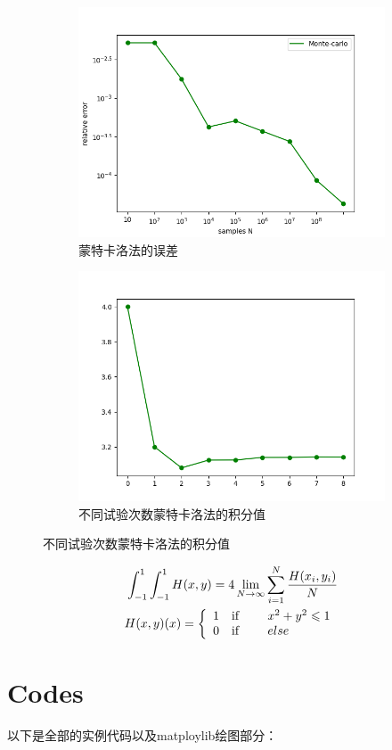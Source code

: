 \begin{figure}[tp]
    \centering
    \begin{subfigure}{0.45\linewidth}
        \includegraphics[width=\linewidth]{figures/MCerr.png} 
        \caption{蒙特卡洛法的误差}
    \end{subfigure}
    \begin{subfigure}{0.45\linewidth}
    \includegraphics[width=\linewidth]{figures/MC.png} 
    \caption{不同试验次数蒙特卡洛法的积分值}
    \end{subfigure}
\end{figure}
\begin{tauenv}[frametitle=Example]
    \begin{align}
        \int_{-1}^{1}\int_{-1}^{1} H(x,y)=4\lim_{N\rightarrow \infty}\sum_{i=1}^{N}\frac{H(x_i,y_i)}{N}\\
        H(x,y)(x)=\left\{
            \begin{array}{rl}
            1 & \text{if \qquad} x^2+y^2\leqslant 1\\
            0 & \text{if \qquad} else
            \end{array} \right .\notag
    \end{align}
\end{tauenv}
\nolinenumbers

\linenumbers
\section{Codes}
以下是全部的实例代码以及matploylib绘图部分：
	\nolinenumbers
	
	\linenumbers
